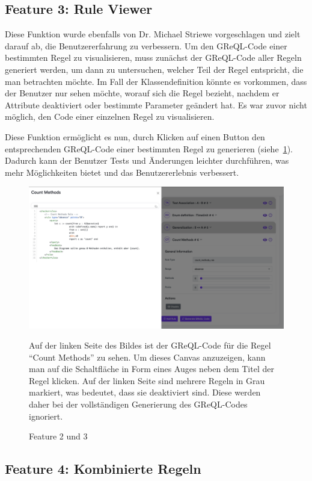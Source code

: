 \subsection{Feature 3: Rule Viewer}
Diese Funktion wurde ebenfalls von Dr. Michael Striewe vorgeschlagen und zielt darauf ab, die Benutzererfahrung zu
verbessern. Um den GReQL-Code einer bestimmten Regel zu visualisieren, muss zunächst der GReQL-Code aller Regeln
generiert werden, um dann zu untersuchen, welcher Teil der Regel entspricht, die man betrachten möchte. Im Fall der
Klassendefinition könnte es vorkommen, dass der Benutzer nur sehen möchte, worauf sich die Regel bezieht, nachdem er
Attribute deaktiviert oder bestimmte Parameter geändert hat. Es war zuvor nicht möglich, den Code einer einzelnen Regel
zu visualisieren.

Diese Funktion ermöglicht es nun, durch Klicken auf einen Button den entsprechenden GReQL-Code einer bestimmten Regel
zu generieren (siehe~\ref{fig:feat2n3}). Dadurch kann der Benutzer Tests und Änderungen leichter durchführen, was mehr Möglichkeiten bietet und
das Benutzererlebnis verbessert.

\begin{figure}[h]
    \centering
    \includegraphics[width=16cm]{images/features-2n3}
    \caption{Feature 2 und 3}
    \medskip
    \small
    Auf der linken Seite des Bildes ist der GReQL-Code für die Regel ``Count Methods'' zu sehen. Um dieses Canvas
    anzuzeigen, kann man auf die Schaltfläche in Form eines Auges neben dem Titel der Regel klicken. Auf der linken
    Seite sind mehrere Regeln in Grau markiert, was bedeutet, dass sie deaktiviert sind. Diese werden daher bei der
    vollständigen Generierung des GReQL-Codes ignoriert.
    \label{fig:feat2n3}
\end{figure}

\subsection{Feature 4: Kombinierte Regeln}

